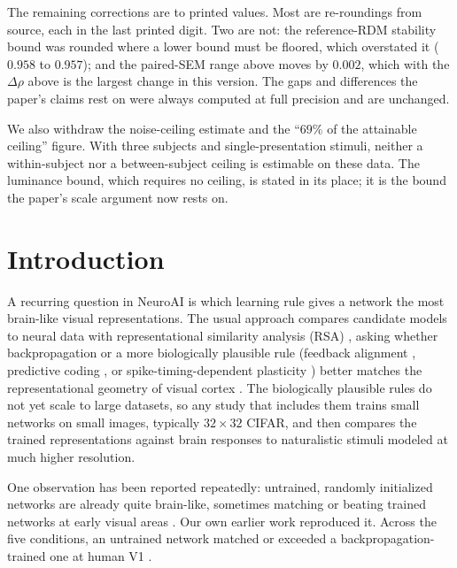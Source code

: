 \documentclass[10pt,twocolumn]{article}
\begin{document}
The remaining corrections are to printed values. Most are re-roundings from source, each in the last printed digit. Two are not: the reference-RDM stability bound was rounded where a lower bound must be floored, which overstated it ($0.958$ to $0.957$); and the paired-SEM range above moves by $0.002$, which with the $\Delta\rho$ above is the largest change in this version. The gaps and differences the paper's claims rest on were always computed at full precision and are unchanged.

We also withdraw the noise-ceiling estimate and the ``$69\%$ of the attainable ceiling'' figure. With three subjects and single-presentation stimuli, neither a within-subject nor a between-subject ceiling is estimable on these data. The luminance bound, which requires no ceiling, is stated in its place; it is the bound the paper's scale argument now rests on.

\section{Introduction}

A recurring question in NeuroAI is which learning rule gives a network the most brain-like visual representations. The usual approach compares candidate models to neural data with representational similarity analysis (RSA) \citep{kriegeskorte2008}, asking whether backpropagation or a more biologically plausible rule (feedback alignment \citep{lillicrap2016}, predictive coding \citep{rao1999,whittington2017}, or spike-timing-dependent plasticity \citep{bi1998,masquelier2007}) better matches the representational geometry of visual cortex \citep{yamins2016,schrimpf2020}. The biologically plausible rules do not yet scale to large datasets, so any study that includes them trains small networks on small images, typically $32\times32$ CIFAR, and then compares the trained representations against brain responses to naturalistic stimuli modeled at much higher resolution.

One observation has been reported repeatedly: untrained, randomly initialized networks are already quite brain-like, sometimes matching or beating trained networks at early visual areas \citep{saxe2011,truzzi2025}. Our own earlier work reproduced it. Across the five conditions, an untrained network matched or exceeded a backpropagation-trained one at human V1 \citep[at $224$\,px, untrained $\rho = 0.075$ vs.\ backprop $\rho = 0.033$; $\Delta\rho = +0.042$, $p<0.001$;][]{leutenegger2026}.
\end{document}
